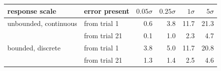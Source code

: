 \begin{tabular}{llrrrr}
\toprule
response scale & error present & $0.05\sigma$ & $0.25\sigma$ & $1\sigma$ & $5\sigma$ \\
\midrule
unbounded, continuous & from trial 1 & 0.6 & 3.8 & 11.7 & 21.3 \\
 & from trial 21 & 0.1 & 1.0 & 2.3 & 4.7 \\
bounded, discrete & from trial 1 & 3.8 & 5.0 & 11.7 & 20.8 \\
 & from trial 21 & 1.3 & 1.4 & 2.5 & 4.6 \\
\bottomrule
\end{tabular}
